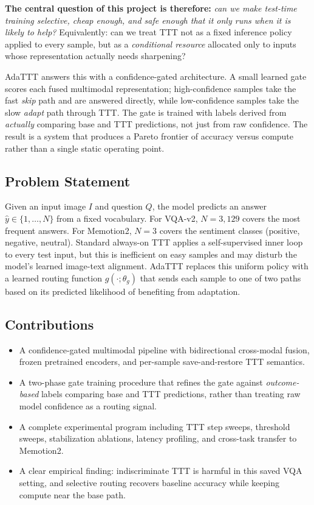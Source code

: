 \documentclass[conference]{IEEEtran}
\begin{document}
\textbf{The central question of this project is therefore:} \emph{can we
make test-time training selective, cheap enough, and safe enough that it
only runs when it is likely to help?} Equivalently: can we treat TTT
not as a fixed inference policy applied to every sample, but as a
\emph{conditional resource} allocated only to inputs whose representation
actually needs sharpening?

AdaTTT answers this with a confidence-gated architecture. A small learned
gate scores each fused multimodal representation; high-confidence samples
take the fast \emph{skip} path and are answered directly, while
low-confidence samples take the slow \emph{adapt} path through TTT. The
gate is trained with labels derived from \emph{actually} comparing base
and TTT predictions, not just from raw confidence. The result is a system
that produces a Pareto frontier of accuracy versus compute rather than a
single static operating point.

\subsection{Problem Statement}

Given an input image $I$ and question $Q$, the model predicts an answer
$\hat{y} \in \{1,\dots,N\}$ from a fixed vocabulary. For VQA-v2, $N{=}3{,}129$
covers the most frequent answers. For Memotion2, $N{=}3$ covers the
sentiment classes (positive, negative, neutral). Standard always-on TTT
applies a self-supervised inner loop to every test input, but this is
inefficient on easy samples and may disturb the model's learned image-text
alignment. AdaTTT replaces this uniform policy with a learned routing
function $g(\cdot;\theta_g)$ that sends each sample to one of two paths
based on its predicted likelihood of benefiting from adaptation.

\subsection{Contributions}

\begin{itemize}
    \item A confidence-gated multimodal pipeline with bidirectional cross-modal
    fusion, frozen pretrained encoders, and per-sample save-and-restore TTT
    semantics.
    \item A two-phase gate training procedure that refines the gate against
    \emph{outcome-based} labels comparing base and TTT predictions, rather
    than treating raw model confidence as a routing signal.
    \item A complete experimental program including TTT step sweeps,
    threshold sweeps, stabilization ablations, latency profiling, and
    cross-task transfer to Memotion2.
    \item A clear empirical finding: indiscriminate TTT is harmful in this
    saved VQA setting, and selective routing recovers baseline accuracy
    while keeping compute near the base path.
\end{itemize}
\end{document}
